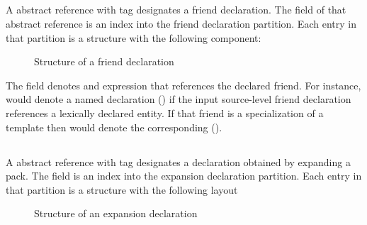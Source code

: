 


\subsection{}
\label{sec:ifc:DeclSort:Friend}

A  abstract reference with tag  designates a friend declaration.
The  field of that abstract reference is an index into the friend declaration partition.
Each entry in that partition is a structure with the following component:
%
\begin{figure}[H]
	\centering
	\caption{Structure of a friend declaration}
	\label{fig:ifc:DeclSort:Friend}
\end{figure}
%

The  field denotes and expression that references the declared friend.  For instance, 
would denote a named declaration () if the input source-level friend declaration references
a lexically declared entity.  If that friend is a specialization of a template then  would denote 
the corresponding  ().



\subsection{}
\label{sec:ifc:DeclSort:Expansion}

A  abstract reference with tag  designates
a declaration obtained by expanding a pack.  The  field is an index
into the expansion declaration partition.  Each entry in that partition is a structure
with the following layout
%
\begin{figure}[H]
	\centering
	\caption{Structure of an expansion declaration}
	\label{fig:ifc-expansion-declaration-structure}
\end{figure}
%


